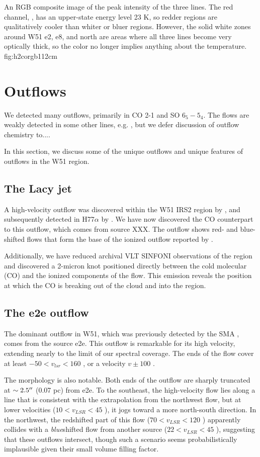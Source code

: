\documentclass{aa}
\begin{document}
{An RGB composite image of the peak intensity of the three \formaldehyde lines.
The red channel, \threeohthree, has an upper-state energy level 23 K, so redder
regions are qualitatively cooler than whiter or bluer regions.  However, the solid
white zones around W51 e2, e8, and north are areas where all three lines become
very optically thick, so the color no longer implies anything about the temperature.}
{fig:h2corgb}{1}{12cm}

\section{Outflows}
\label{sec:outflows}
We detected many outflows, primarily in CO 2-1 and SO $6_5-5_4$.  The flows are weakly detected in some
other lines, e.g. \formaldehyde, but we defer discussion of outflow chemistry to....

In this section, we discuss some of the unique outflows and unique features of
outflows in the W51 region.  

\subsection{The Lacy jet}
A high-velocity outflow was discovered within the W51 IRS2 region by
\citet{Lacy2007a}, and subsequently detected in H77$\alpha$ by
\citet{Ginsburg2016b}.  We have now discovered the CO counterpart to this
outflow, which comes from source XXX.   The outflow shows red- and blue-shifted
flows that form the base of the ionized outflow reported by \citet{Lacy2007a}.

Additionally, we have reduced archival VLT SINFONI observations of the region
and discovered a 2-micron \hh knot positioned directly between the cold
molecular (CO) and the ionized components of the flow.  This \hh emission
reveals the position at which the CO is breaking out of the cloud and into the
\hii region.

\subsection{The e2e outflow}
The dominant outflow in W51, which was previously detected by the SMA \citep{},
comes from the source e2e.  This outflow is remarkable for its high velocity,
extending nearly to the limit of our spectral coverage.  The ends of the flow
cover at least $-50 < v_{lsr} < 160$ \kms, or a velocity $v\pm100$ \kms.  

The morphology is also notable.  Both ends of the outflow are sharply truncated
at $\sim2.5\mbox{$^{\prime\prime}$}$ (0.07 pc) from e2e. To the southeast, the high-velocity
flow lies along a line that is consistent with the extrapolation from the
northwest flow,
but at lower velocities ($10 < v_{LSR} < 45$ \kms), it jogs toward a more
north-south direction.  In the northwest, the redshifted part of this flow ($70
< v_{LSR} < 120$ \kms) apparently collides with a \emph{blue}shifted flow from
another source ($22 < v_{LSR} < 45$ \kms), suggesting that these outflows
intersect, though such a scenario seems probabilistically implausible given
their small volume filling factor.
\end{document}
